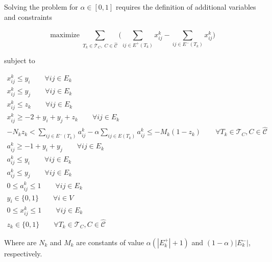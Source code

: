 \clearpage

Solving the problem for $\alpha \in [0, 1]$ requires the definition of
additional variables and constraints

\begin{equation}
	\label{eq:ecp-exact2}
	\text{maximize} \; \sum_{ T_{k} \in \mathcal{T}_{C}, \; C \in
		\mathcal{\hat{C}} } \big( \sum^{}_{ij \in E^{+} (T_{k})} x_{ij}
		^{k} - \sum_{ij \in E^{-} (T_{k})} x_{ij} ^{k} \big)
\end{equation} \begin{center} subject to \end{center}
\begin{gather}
	\label{eq:ecp-v12}
	x _{ij}^{k}  \leq y_i \quad\quad \forall ij \in E_k  \\
	\label{eq:ecp-v22}
	x _{ij}^{k}  \leq y_j \quad\quad \forall ij \in E_k \\
	\label{eq:ecp-t2}
	x _{ij}^{k}  \leq z_k \quad\quad \forall ij \in E_k \\
	\label{eq:ecp-e2}
	x _{ij} ^{k} \geq - 2 + y_i + y_j + z_k \quad\quad \forall ij \in E_k \\
	\label{eq:ecp-a-alpha-constraint}
	-N_k z_k < \sum^{}_{ij \in E^{-} (T_k)} a_{ij}^{k}  - \alpha \sum^{}_{ij \in E(T_k)}
	a_{ij} ^{k} \leq - M_{k} (1 - z_{k})  \quad\quad \forall T_{k} \in
	\mathcal{T} _{C}, C \in \mathcal{\hat{C}} \\
	\label{eq:ecp-a-ij-g-i-j2}
	a_{ij}^{k} \geq -1 + y_i + y_j \quad\quad \forall ij \in E_k \\
	\label{eq:ecp-a-ij-l-i2}
	a_{ij}^{k} \leq y_i\quad\quad \forall ij \in E_k \\
	\label{eq:ecp-a-ij-l-j2}
	a_{ij}^{k} \leq y_j \quad\quad \forall ij \in E_k \\
	\label{eq:ecp-a-domain-2}
	0 \leq a_{ij}^{k} \leq 1 \quad\quad \forall ij \in E_k \\
	\label{eq:ecp-vertex-def2}
	y _{i} \in  \{0, 1\} \quad\quad \forall i \in V \\
	\label{eq:ecp-edge-def2}
	0 \leq x _{ij} ^{k}  \leq 1 \quad\quad \forall ij \in E_k \\
	\label{eq:ecp-z-domain-2}
	z _{k} \in  \{0, 1\} \quad\quad \forall T_{k} \in \mathcal{T} _{C}, C \in
	\hat{\mathcal{C}}
\end{gather}

Where are $N_k$ and $M_k$ are constants of value $\alpha (|E_k^{+}| + 1)$ and $(1 -
	\alpha ) |E^{-}_k|$, respectively.

